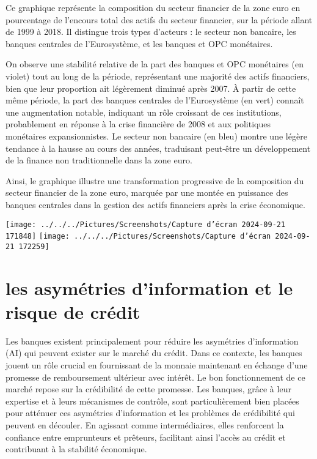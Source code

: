 \documentclass[a4paper, 12pt]{report}
\begin{document}
Ce graphique représente la composition du secteur financier de la zone euro en pourcentage de l'encours total des actifs du secteur financier, sur la période allant de 1999 à 2018. Il distingue trois types d'acteurs : le secteur non bancaire, les banques centrales de l'Eurosystème, et les banques et OPC monétaires.

On observe une stabilité relative de la part des banques et OPC monétaires (en violet) tout au long de la période, représentant une majorité des actifs financiers, bien que leur proportion ait légèrement diminué après 2007. À partir de cette même période, la part des banques centrales de l'Eurosystème (en vert) connaît une augmentation notable, indiquant un rôle croissant de ces institutions, probablement en réponse à la crise financière de 2008 et aux politiques monétaires expansionnistes. Le secteur non bancaire (en bleu) montre une légère tendance à la hausse au cours des années, traduisant peut-être un développement de la finance non traditionnelle dans la zone euro.

Ainsi, le graphique illustre une transformation progressive de la composition du secteur financier de la zone euro, marquée par une montée en puissance des banques centrales dans la gestion des actifs financiers après la crise économique.

\begin{center}
	\texttt{[image: ../../../Pictures/Screenshots/Capture d'écran 2024-09-21 171848]}
	\texttt{[image: ../../../Pictures/Screenshots/Capture d'écran 2024-09-21 172259]}
	
\end{center}

\chapter{les asymétries d’information et le risque de crédit}

Les banques existent principalement pour réduire les asymétries d'information (AI) qui peuvent exister sur le marché du crédit. Dans ce contexte, les banques jouent un rôle crucial en fournissant de la monnaie maintenant en échange d'une promesse de remboursement ultérieur avec intérêt. Le bon fonctionnement de ce marché repose sur la crédibilité de cette promesse. Les banques, grâce à leur expertise et à leurs mécanismes de contrôle, sont particulièrement bien placées pour atténuer ces asymétries d'information et les problèmes de crédibilité qui peuvent en découler. En agissant comme intermédiaires, elles renforcent la confiance entre emprunteurs et prêteurs, facilitant ainsi l'accès au crédit et contribuant à la stabilité économique.
\end{document}
